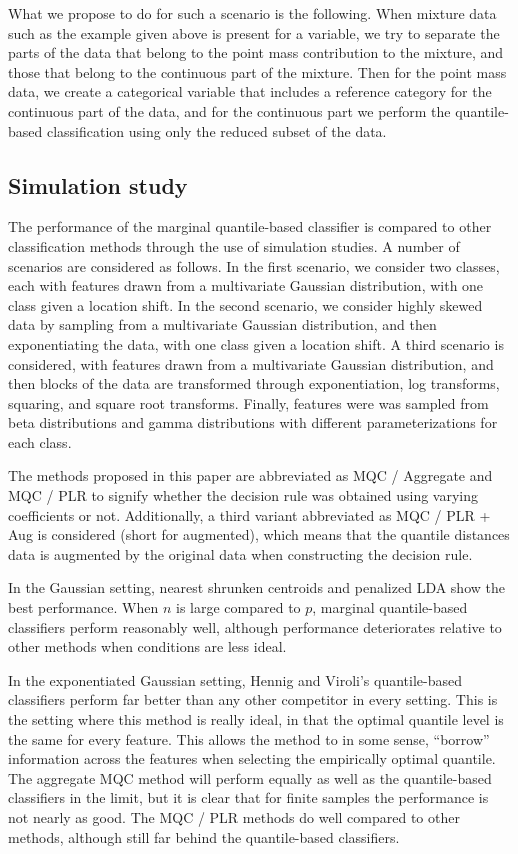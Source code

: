 What we propose to do for such a scenario is the following.  When mixture data
such as the example given above is present for a variable, we try to separate
the parts of the data that belong to the point mass contribution to the mixture,
and those that belong to the continuous part of the mixture.  Then for the point
mass data, we create a categorical variable that includes a reference category
for the continuous part of the data, and for the continuous part we perform the
quantile-based classification using only the reduced subset of the data.




\subsection{Simulation study}
\label{sec: simulation}

The performance of the marginal quantile-based classifier is compared to other
classification methods through the use of simulation studies.  A number of
scenarios are considered as follows.  In the first scenario, we consider two
classes, each with features drawn from a multivariate Gaussian distribution,
with one class given a location shift.  In the second scenario, we consider
highly skewed data by sampling from a multivariate Gaussian distribution, and
then exponentiating the data, with one class given a location shift.  A third
scenario is considered, with features drawn from a multivariate Gaussian
distribution, and then blocks of the data are transformed through
exponentiation, log transforms, squaring, and square root transforms.  Finally,
features were was sampled from beta distributions and gamma distributions with
different parameterizations for each class.

The methods proposed in this paper are abbreviated as MQC / Aggregate and MQC /
PLR to signify whether the decision rule was obtained using varying coefficients
or not.  Additionally, a third variant abbreviated as MQC / PLR + Aug is
considered (short for augmented), which means that the quantile distances data
is augmented by the original data when constructing the decision rule.

In the Gaussian setting, nearest shrunken centroids and penalized LDA show the
best performance.  When $n$ is large compared to $p$, marginal quantile-based
classifiers perform reasonably well, although performance deteriorates relative
to other methods when conditions are less ideal.

In the exponentiated Gaussian setting, Hennig and Viroli's quantile-based
classifiers perform far better than any other competitor in every setting.  This
is the setting where this method is really ideal, in that the optimal quantile
level is the same for every feature.  This allows the method to in some sense,
``borrow'' information across the features when selecting the empirically
optimal quantile.  The aggregate MQC method will perform equally as well as the
quantile-based classifiers in the limit, but it is clear that for finite samples
the performance is not nearly as good.  The MQC / PLR methods do well compared
to other methods, although still far behind the quantile-based classifiers.

